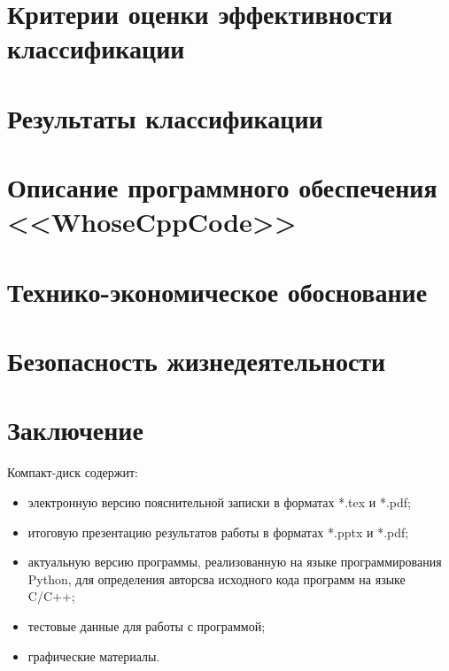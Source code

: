 \section{Критерии оценки эффективности классификации}\label{eval}

\newpage
\section{Результаты классификации}


\newpage
\section{Описание программного обеспечения <<WhoseCppCode>>}


% 

\clearpage
\section{Технико-экономическое обоснование}


\newpage
\section{Безопасность жизнедеятельности}

 
\newpage
\section*{Заключение}

 
 
 \newpage
 \renewcommand{\refname}{Список использованных источников}
 

 Компакт-диск содержит: 
 \begin{itemize}
 \item электронную версию пояснительной записки в форматах *.tex и *.pdf;
 \item итоговую презентацию результатов работы в форматах *.pptx и *.pdf;
 \item актуальную версию программы, реализованную на языке программирования Python, для определения авторсва исходного кода программ на языке C/C++;
 \item тестовые данные для работы с программой;
 \item графические материалы.
 \end{itemize}
 
